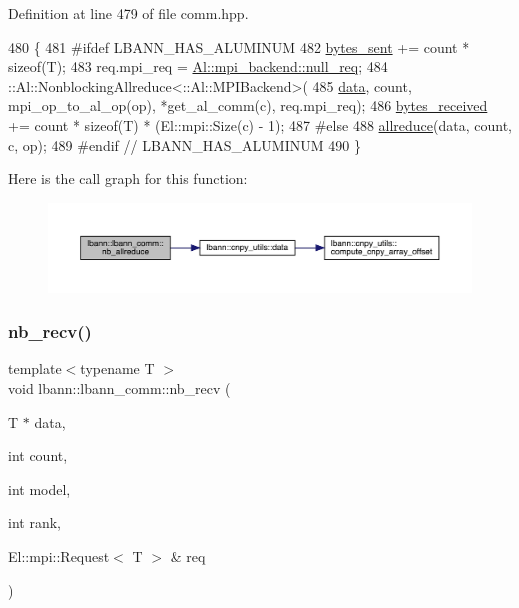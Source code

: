 Definition at line 479 of file comm.\+hpp.


\begin{DoxyCode}
480                                            \{
481 \textcolor{preprocessor}{#ifdef LBANN\_HAS\_ALUMINUM}
482     \hyperlink{classlbann_1_1lbann__comm_ad1f146ae7337ece6266fd307944928e0}{bytes\_sent} += count * \textcolor{keyword}{sizeof}(T);
483     req.mpi\_req = \hyperlink{classlbann_1_1Al_1_1dummy__backend_a458ac4eb9f62b06984b4ef1b1eeb5851}{Al::mpi\_backend::null\_req};
484     ::Al::NonblockingAllreduce<::Al::MPIBackend>(
485       \hyperlink{namespacelbann_1_1cnpy__utils_a9ac86d96ccb1f8b4b2ea16441738781f}{data}, count, mpi\_op\_to\_al\_op(op), *get\_al\_comm(c), req.mpi\_req);
486     \hyperlink{classlbann_1_1lbann__comm_afb99f57f7eafc0695bf28e6c26a8120f}{bytes\_received} += count * \textcolor{keyword}{sizeof}(T) * (El::mpi::Size(c) - 1);
487 \textcolor{preprocessor}{#else}
488     \hyperlink{classlbann_1_1lbann__comm_af5631e5f0f54e4df4958eba9df2599ef}{allreduce}(data, count, c, op);
489 \textcolor{preprocessor}{#endif  // LBANN\_HAS\_ALUMINUM}
490   \}
\end{DoxyCode}
Here is the call graph for this function\+:\nopagebreak
\begin{figure}[H]
\begin{center}
\leavevmode
\includegraphics[width=350pt]{classlbann_1_1lbann__comm_afb144a99e0cd2241f5fb05cad68b1f08_cgraph}
\end{center}
\end{figure}
\mbox{\label{classlbann_1_1lbann__comm_aac24e8802602c73efddb455274e158f4}} 
\subsubsection{\texorpdfstring{nb\+\_\+recv()}{nb\_recv()}\hspace{0.1cm}{\footnotesize\ttfamily [1/9]}}
{\footnotesize\ttfamily template$<$typename T $>$ \\
void lbann\+::lbann\+\_\+comm\+::nb\+\_\+recv (\begin{DoxyParamCaption}\item[{T $\ast$}]{data,  }\item[{int}]{count,  }\item[{int}]{model,  }\item[{int}]{rank,  }\item[{El\+::mpi\+::\+Request$<$ T $>$ \&}]{req }\end{DoxyParamCaption})\hspace{0.3cm}{\ttfamily [inline]}}

